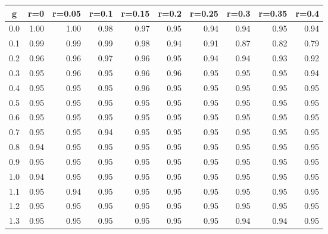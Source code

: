 %
\begin{table}[!tbp]
 \begin{center}
 \begin{tabular}{rrrrrrrrrr}\hline\hline
\multicolumn{1}{c}{g}&\multicolumn{1}{c}{r=0}&\multicolumn{1}{c}{r=0.05}&\multicolumn{1}{c}{r=0.1}&\multicolumn{1}{c}{r=0.15}&\multicolumn{1}{c}{r=0.2}&\multicolumn{1}{c}{r=0.25}&\multicolumn{1}{c}{r=0.3}&\multicolumn{1}{c}{r=0.35}&\multicolumn{1}{c}{r=0.4}\tabularnewline
\hline
0.0&1.00&1.00&0.98&0.97&0.95&0.94&0.94&0.95&0.94\tabularnewline
0.1&0.99&0.99&0.99&0.98&0.94&0.91&0.87&0.82&0.79\tabularnewline
0.2&0.96&0.96&0.97&0.96&0.95&0.94&0.94&0.93&0.92\tabularnewline
0.3&0.95&0.96&0.95&0.96&0.96&0.95&0.95&0.95&0.94\tabularnewline
0.4&0.95&0.95&0.95&0.96&0.95&0.95&0.95&0.95&0.95\tabularnewline
0.5&0.95&0.95&0.95&0.95&0.95&0.95&0.95&0.95&0.95\tabularnewline
0.6&0.95&0.95&0.95&0.95&0.95&0.95&0.95&0.95&0.95\tabularnewline
0.7&0.95&0.95&0.94&0.95&0.95&0.95&0.95&0.95&0.95\tabularnewline
0.8&0.94&0.95&0.95&0.95&0.95&0.95&0.95&0.95&0.95\tabularnewline
0.9&0.95&0.95&0.95&0.95&0.95&0.95&0.95&0.95&0.95\tabularnewline
1.0&0.94&0.95&0.95&0.95&0.95&0.95&0.95&0.95&0.95\tabularnewline
1.1&0.95&0.94&0.95&0.95&0.95&0.95&0.95&0.95&0.95\tabularnewline
1.2&0.95&0.95&0.95&0.95&0.95&0.95&0.95&0.95&0.95\tabularnewline
1.3&0.95&0.95&0.95&0.95&0.95&0.95&0.94&0.94&0.95\tabularnewline
\hline
\end{tabular}

\end{center}

\end{table}

